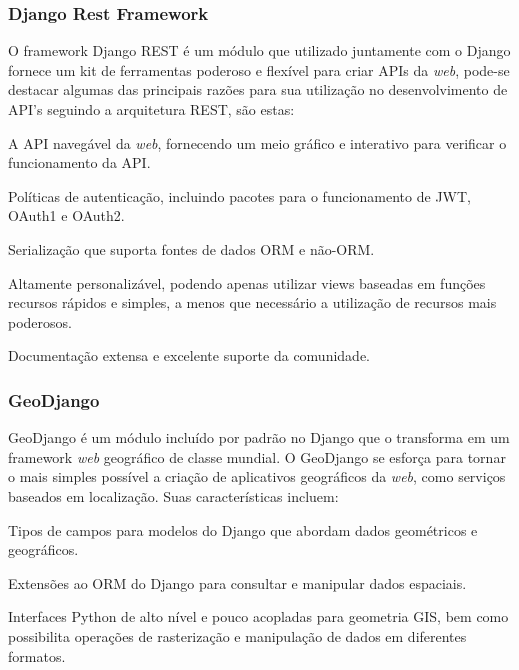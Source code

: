 {{{{{{{\subsubsection{Django Rest Framework}

O framework Django REST é um módulo que utilizado juntamente com o Django fornece um kit de ferramentas poderoso e flexível para criar APIs da \textit{web}, pode-se destacar algumas das principais razões para sua utilização no desenvolvimento de API's seguindo a arquitetura REST, são estas:

\begin{lista}
\item A API navegável da \textit{web}, fornecendo um meio gráfico e interativo para verificar o funcionamento da API.
\item Políticas de autenticação, incluindo pacotes para o funcionamento de JWT, OAuth1 e OAuth2.
\item Serialização que suporta fontes de dados ORM e não-ORM.
\item Altamente personalizável, podendo apenas utilizar views baseadas em funções recursos rápidos e simples, a menos que necessário a utilização de recursos mais poderosos.
\item Documentação extensa e excelente suporte da comunidade.
\end{lista}

\subsubsection{GeoDjango}

GeoDjango é um módulo incluído por padrão no Django que o transforma em um framework \textit{web} geográfico de classe mundial. O GeoDjango se esforça para tornar o mais simples possível a criação de aplicativos geográficos da \textit{web}, como serviços baseados em localização. Suas características incluem:

\begin{lista}
\item Tipos de campos para modelos do Django que abordam dados geométricos e geográficos.
\item Extensões ao ORM do Django para consultar e manipular dados espaciais.
\item Interfaces Python de alto nível e pouco acopladas para geometria GIS, bem como possibilita operações de rasterização e manipulação de dados em diferentes formatos.
\end{lista}

}}}}}}}
